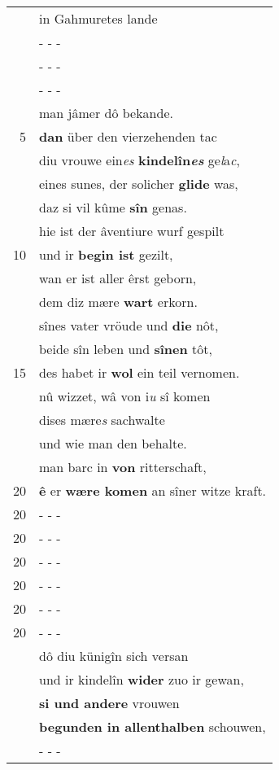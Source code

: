 \documentclass[8pt,a4paper,notitlepage]{article}
\begin{document}
\begin{table}[ht]
\begin{minipage}[t]{0.5\linewidth}
\begin{tabular}{rl}
 & in Gahmuretes lande\\ 
 & \multicolumn{1}{l}{ - - - }\\ 
 & \multicolumn{1}{l}{ - - - }\\ 
 & \multicolumn{1}{l}{ - - - }\\ 
 & man jâmer dô bekande.\\ 
5 & \textbf{dan} über den vierzehenden tac\\ 
 & diu vrouwe ein\textit{es} \textbf{kindelîn\textit{es}} ge\textit{l}a\textit{c},\\ 
 & eines sunes, der solicher \textbf{glide} was,\\ 
 & daz si vil kûme \textbf{sîn} genas.\\ 
 & hie ist der âventiure wurf gespilt\\ 
10 & und ir \textbf{begin ist} gezilt,\\ 
 & wan er ist aller êrst geborn,\\ 
 & dem diz mære \textbf{wart} erkorn.\\ 
 & sînes vater vröude und \textbf{die} nôt,\\ 
 & beide sîn leben und \textbf{sînen} tôt,\\ 
15 & des habet ir \textbf{wol} ein teil vernomen.\\ 
 & nû wizzet, wâ von i\textit{u} sî komen\\ 
 & dises mære\textit{s} sachwalte\\ 
 & und wie man den behalte.\\ 
 & man barc in \textbf{von} ritterschaft,\\ 
20 & \textbf{ê} er \textbf{wære komen} an sîner witze kraft.\\ 
20 & \multicolumn{1}{l}{ - - - }\\ 
20 & \multicolumn{1}{l}{ - - - }\\ 
20 & \multicolumn{1}{l}{ - - - }\\ 
20 & \multicolumn{1}{l}{ - - - }\\ 
20 & \multicolumn{1}{l}{ - - - }\\ 
20 & \multicolumn{1}{l}{ - - - }\\ 
 & dô diu künigîn sich versan\\ 
 & und ir kindelîn \textbf{wider} zuo ir gewan,\\ 
 & \textbf{si und andere} vrouwen\\ 
 & \textbf{begunden in allenthalben} schouwen,\\ 
 & \multicolumn{1}{l}{ - - - }\\ 

\end{tabular}
\end{minipage}
\end{table}
\end{document}
